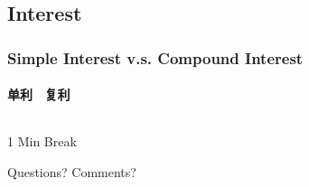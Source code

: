 \documentclass[
	11pt, %
	handout,
]{beamer}
\begin{document}


\subsection{Interest}

\begin{frame}
	\frametitle{Simple Interest v.s. Compound Interest}
	\framesubtitle{单利 \ 复利}

	\begin{columns}[t] 
		\begin{column}{0.5\textwidth} %

		\end{column}

		\begin{column}{0.5\textwidth} %

    \end{column}

	\end{columns}
\end{frame}






\begin{frame}[plain] %
	\begin{center}
		{\Huge 1 Min Break}
		\bigskip\bigskip %
		
		{\LARGE Questions? Comments?}
	\end{center}
\end{frame}

\end{document}

